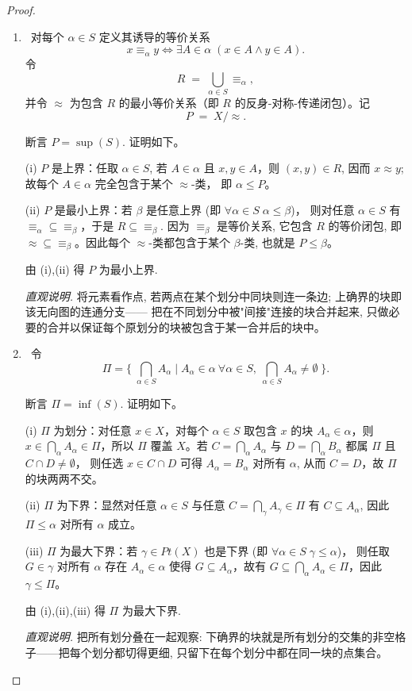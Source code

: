 \begin{proof}
	\begin{enumerate}[(1)]
		\item[上确界]\
			对每个 $\alpha\in S$ 定义其诱导的等价关系
			\[x\equiv_{\alpha} y \iff \exists A\in\alpha\; (x\in A\land y\in A).
			\]
			令
			\[R\;=\;\bigcup_{\alpha\in S} \equiv_{\alpha},\]
			并令 $\approx$ 为包含 $R$ 的最小等价关系（即 $R$ 的反身-对称-传递闭包）。记
			\[P\;=\;X/\approx.
			\]

			断言 $P=\sup(S)$. 证明如下。

			(i) $P$ 是上界：任取 $\alpha\in S$, 若 $A\in\alpha$ 且 $x,y\in A$，则 $(x,y)\in R$, 因而 $x\approx y$;
			故每个 $A\in\alpha$ 完全包含于某个 $\approx$-类， 即 $\alpha\le P$。

			(ii) $P$ 是最小上界：若 $\beta$ 是任意上界 (即 $\forall\alpha\in S\;\alpha\le\beta$)，
			则对任意 $\alpha\in S$ 有 $\equiv_{\alpha}\subseteq\equiv_{\beta}$，于是
			$R\subseteq\equiv_{\beta}$. 因为 $\equiv_{\beta}$ 是等价关系, 它包含 $R$ 的等价闭包, 即
			$\approx\subseteq\equiv_{\beta}$。因此每个 $\approx$-类都包含于某个 $\beta$-类, 也就是 $P\le\beta$。

			由 (i),(ii) 得 $P$ 为最小上界.

			\emph{直观说明.} 将元素看作点, 若两点在某个划分中同块则连一条边; 上确界的块即该无向图的连通分支——
			把在不同划分中被"间接"连接的块合并起来, 只做必要的合并以保证每个原划分的块被包含于某一合并后的块中。

		\item[下确界]\
			令
			\[\Pi=\Big\{\;\bigcap_{\alpha\in S}A_{\alpha}\;\Big|\;A_{\alpha}\in\alpha\ \forall\alpha\in S,\ \bigcap_{\alpha\in S}A_{\alpha}\neq\emptyset\;\Big\}.
			\]

			断言 $\Pi=\inf(S)$. 证明如下。

			(i) $\Pi$ 为划分：对任意 $x\in X$，对每个 $\alpha\in S$ 取包含 $x$ 的块 $A_{\alpha}\in\alpha$，则
			$x\in\bigcap_{\alpha}A_{\alpha}\in\Pi$，所以 $\Pi$ 覆盖 $X$。若
			$C=\bigcap_{\alpha}A_{\alpha}$ 与 $D=\bigcap_{\alpha}B_{\alpha}$ 都属 $\Pi$ 且 $C\cap D\neq\emptyset$，
			则任选 $x\in C\cap D$ 可得 $A_{\alpha}=B_{\alpha}$ 对所有 $\alpha$, 从而 $C=D$，故 $\Pi$ 的块两两不交。

			(ii) $\Pi$ 为下界：显然对任意 $\alpha\in S$ 与任意 $C=\bigcap_{\gamma}A_{\gamma}\in\Pi$ 有 $C\subseteq A_{\alpha}$,
			因此 $\Pi\le\alpha$ 对所有 $\alpha$ 成立。

			(iii) $\Pi$ 为最大下界：若 $\gamma\in Pt(X)$ 也是下界 (即 $\forall\alpha\in S\;\gamma\le\alpha$)，
			则任取 $G\in\gamma$ 对所有 $\alpha$ 存在 $A_{\alpha}\in\alpha$ 使得 $G\subseteq A_{\alpha}$，故有
			$G\subseteq\bigcap_{\alpha}A_{\alpha}\in\Pi$，因此 $\gamma\le\Pi$。

			由 (i),(ii),(iii) 得 $\Pi$ 为最大下界.

			\emph{直观说明.} 把所有划分叠在一起观察: 下确界的块就是所有划分的交集的非空格子——把每个划分都切得更细,
			只留下在每个划分中都在同一块的点集合。
	\end{enumerate}
\end{proof}

